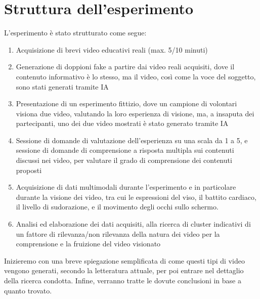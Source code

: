 \section*{Struttura dell'esperimento}

L'esperimento è stato strutturato come segue:
\begin{enumerate}
\item Acquisizione di brevi video educativi reali (max. 5/10 minuti)
\item Generazione di doppioni fake a partire dai video reali acquisiti, dove il contenuto informativo è lo stesso, ma il video, così come la voce del soggetto, sono stati generati tramite IA
\item Presentazione di un esperimento fittizio, dove un campione di volontari visiona due video, valutando la loro esperienza di visione, ma, a insaputa dei partecipanti, uno dei due video mostrati è stato generato tramite IA
\item Sessione di domande di valutazione dell'esperienza su una scala da 1 a 5, e sessione di domande di comprensione a risposta multipla sui contenuti discussi nei video, per valutare il grado di comprensione dei contenuti proposti
\item Acquisizione di dati multimodali durante l'esperimento e in particolare durante la visione dei video, tra cui le espressioni del viso, il battito cardiaco, il livello di sudorazione, e il movimento degli occhi sullo schermo.
\item Analisi ed elaborazione dei dati acquisiti, alla ricerca di cluster indicativi di un fattore di rilevanza/non rilevanza della natura dei video per la comprensione e la fruizione del video visionato
\end{enumerate}

Inizieremo con una breve spiegazione semplificata di come questi tipi di video vengono generati, secondo la letteratura attuale, per poi entrare nel dettaglio della ricerca condotta. Infine, verranno tratte le dovute conclusioni in base a quanto trovato.

\clearpage